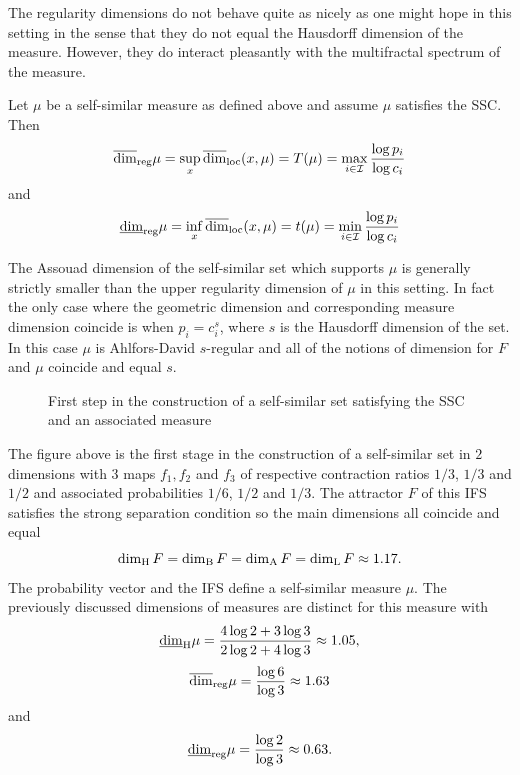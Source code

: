 The regularity dimensions do not behave quite as nicely as one might hope in this setting in the sense that they do not equal the Hausdorff dimension of the measure. However, they do interact pleasantly with the multifractal spectrum of the measure.

\begin{theorem}\label{ch-upper-reg:selfsimilar}
	Let $\mu$ be a self-similar measure as defined above and assume $\mu$ satisfies the SSC.  Then 
	\[
	\overline{\dim}_{\textup{reg}} \mu = \sup_x \overline{\dim}_{\textup{loc}}(x,\mu) = T(\mu) = \max_{i \in \mathcal{I}} \frac{\log p_i}{\log c_i}
	\]
	and 
	\[
	\underline{\dim}_{\textup{reg}} \mu = \inf_x \overline{\dim}_{\textup{loc}}(x,\mu) = t(\mu) = \min_{i \in \mathcal{I}} \frac{\log p_i}{\log c_i}
	\]
\end{theorem}

The Assouad dimension of the self-similar set which supports $\mu$ is generally strictly smaller than the upper regularity dimension of $\mu$ in this setting.  In fact the only case where the geometric dimension and corresponding measure dimension coincide is when  $p_i=c_i^s$, where $s$ is the Hausdorff dimension of the set. In this case $\mu$ is Ahlfors-David $s$-regular and all of the notions of dimension for $F$ and $\mu$ coincide and equal $s$.

\begin{figure}[htb]
    \centering
    \caption{First step in the construction of a self-similar set satisfying the SSC and an associated measure}
    \label{fig:ex-self-sim}
\end{figure}



The figure above is the first stage in the construction of a self-similar set in $2$ dimensions with 3 maps $f_1, f_2$ and $f_3$ of respective contraction ratios $1/3$, $1/3$ and $1/2$ and associated probabilities $1/6$, $1/2$ and $1/3$. The attractor $F$ of this IFS satisfies the strong separation condition so the main dimensions all coincide and equal
\[
\dim_{\text{H}} F = \dim_\textup{B} F = \dim_{\textup{A}} F = \dim_{\textup{L}} F \approx 1.17.
\]
The probability vector and the IFS define a self-similar measure $\mu$. The previously discussed dimensions of measures are distinct for this measure with
\[
\underline{\dim}_{\text{H}} \mu = \frac{4 \log 2 + 3 \log 3}{2 \log 2 + 4 \log 3} \approx 1.05,
\]
\[
\overline{\dim}_{\textup{reg}} \mu = \frac{\log 6}{\log 3} \approx 1.63
\]
and 
\[
\underline{\dim}_{\textup{reg}} \mu = \frac{\log 2}{\log 3} \approx 0.63.
\]


